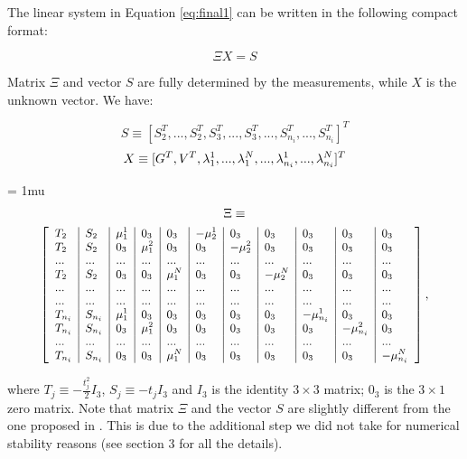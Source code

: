 \documentclass[letterpaper, 10 pt, conference]{ieeeconf}  %
\begin{document}
The linear system in Equation \ref{eq:final1} can be written in the following compact format:

\begin{equation}
\label{eq:mat1} \tag{9}
\Xi X = S
\end{equation}

\noindent Matrix $\Xi$ and vector $S$ are fully determined by the measurements, while $X$ is the unknown vector.
We have:

\[
S \equiv [S_2^T, ...,S_2^T, S_3^T,...,S_3^T,...,S_{n_i}^T,...,S_{n_i}^T]^T
\]
\[
X \equiv [ G^T, V^T, \lambda_1^1, ..., \lambda_1^N, ..., \lambda_{n_i}^1, ..., \lambda_{n_i}^N]^T \\
\]

{
\arraycolsep=3pt %
\medmuskip = 1mu %
\begin{multline*}
  \Xi \equiv \\
      {
        \footnotesize
        \left[
          \begin{array}{l|l|l|l|l|l|l|l|l|l|l}
            T_2 & S_2 & \mu_1^1 & 0_3 & 0_3 & -\mu_2^1 & 0_3 & 0_3 & 0_3 & 0_3 & 0_3 \\
            T_2 & S_2 & 0_3 & \mu_1^2 & 0_3 & 0_3 & -\mu_2^2 & 0_3 & 0_3 & 0_3 & 0_3 \\
            ... & ... & ... & ... & ... & ... & ... & ... & ... & ... & ... \\
            T_2 & S_2 & 0_3 & 0_3 & \mu_1^N & 0_3 & 0_3 & -\mu_2^N & 0_3 & 0_3 & 0_3 \\
            ... & ... & ... & ... & ... & ... & ... & ... & ... & ... & ... \\
            ... & ... & ... & ... & ... & ... & ... & ... & ... & ... & ... \\
            T_{n_i} & S_{n_i} & \mu_1^1 & 0_3 & 0_3 & 0_3 & 0_3 & 0_3 & -\mu_{n_i}^1 & 0_3 & 0_3 \\
            T_{n_i} & S_{n_i} & 0_3 & \mu_1^2 & 0_3 & 0_3 & 0_3 & 0_3 & 0_3 & -\mu_{n_i}^2 & 0_3 \\
            ... & ... & ... & ... & ... & ... & ... & ... & ... & ... & ... \\
            T_{n_i} & S_{n_i} & 0_3 & 0_3 & \mu_1^N & 0_3 & 0_3 & 0_3 & 0_3 & 0_3 & -\mu_{n_i}^N
          \end{array}
          \right],
      }
\end{multline*}
}

\noindent where $T_j \equiv - \frac{t^2_j}{2} I_3$, $S_j \equiv -t_j I_3$ and $I_3$ is the identity $3\times 3$ matrix; $0_3$ is the $3\times 1$ zero matrix.
Note that matrix $\Xi$ and the vector $S$ are slightly different from the one proposed in \cite{Martinelli2014}.
This is due to the additional step we did not take for numerical stability reasons (see \cite{Martinelli2014} section 3 for all the details).
\end{document}
